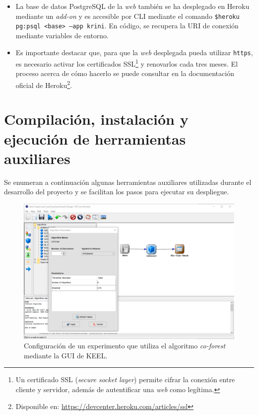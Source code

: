 \begin{itemize}
	\item La base de datos PostgreSQL de la \textit{web} también se ha desplegado en Heroku mediante un \textit{add-on} y es accesible por CLI mediante el comando \texttt{\$heroku pg:psql <base> --app krini}. En código, se recupera la URI de conexión mediante variables de entorno.
	\item Es importante destacar que, para que la \textit{web} desplegada pueda utilizar \texttt{https}, es necesario activar los certificados SSL\footnote{Un certificado SSL (\textit{secure socket layer}) permite cifrar la conexión entre cliente y servidor, además de autentificar una \textit{web} como legítima.} y renovarlos cada tres meses. El proceso acerca de cómo hacerlo se puede consultar en la documentación oficial de Heroku\footnote{Disponible en: \url{https://devcenter.heroku.com/articles/ssl}}.
\end{itemize}


\section{Compilación, instalación y ejecución de herramientas auxiliares}
\label{ds:inst-aux}

Se enumeran a continuación algunas herramientas auxiliares utilizadas durante el desarrollo del proyecto y se facilitan los pasos para ejecutar su despliegue.
\begin{figure}[h]
	\caption[Herramientas auxiliares: experimento en KEEL]{Configuración de un experimento que utiliza el algoritmo \textit{co-forest} mediante la GUI de KEEL.}
	\centering
	\includegraphics[scale=0.5]{../img/anexos/manual/keel_gui.png}
\end{figure}

